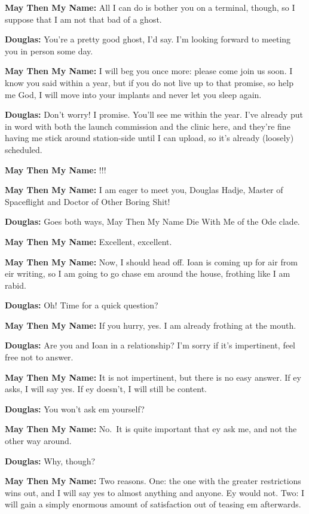 \textbf{May Then My Name:} All I can do is bother you on a terminal, though, so I suppose that I am not that bad of a ghost.

\textbf{Douglas:} You're a pretty good ghost, I'd say. I'm looking forward to meeting you in person some day.

\textbf{May Then My Name:} I will beg you once more: please come join us soon. I know you said within a year, but if you do not live up to that promise, so help me God, I will move into your implants and never let you sleep again.

\textbf{Douglas:} Don't worry! I promise. You'll see me within the year. I've already put in word with both the launch commission and the clinic here, and they're fine having me stick around station-side until I can upload, so it's already (loosely) scheduled.

\textbf{May Then My Name:} !!!

\textbf{May Then My Name:} I am eager to meet you, Douglas Hadje, Master of Spaceflight and Doctor of Other Boring Shit!

\textbf{Douglas:} Goes both ways, May Then My Name Die With Me of the Ode clade.

\textbf{May Then My Name:} Excellent, excellent.

\textbf{May Then My Name:} Now, I should head off. Ioan is coming up for air from eir writing, so I am going to go chase em around the house, frothing like I am rabid.

\textbf{Douglas:} Oh! Time for a quick question?

\textbf{May Then My Name:} If you hurry, yes. I am already frothing at the mouth.

\textbf{Douglas:} Are you and Ioan in a relationship? I'm sorry if it's impertinent, feel free not to answer.

\textbf{May Then My Name:} It is not impertinent, but there is no easy answer. If ey asks, I will say yes. If ey doesn't, I will still be content.

\textbf{Douglas:} You won't ask em yourself?

\textbf{May Then My Name:} No.~It is quite important that ey ask me, and not the other way around.

\textbf{Douglas:} Why, though?

\textbf{May Then My Name:} Two reasons. One: the one with the greater restrictions wins out, and I will say yes to almost anything and anyone. Ey would not. Two: I will gain a simply enormous amount of satisfaction out of teasing em afterwards.

